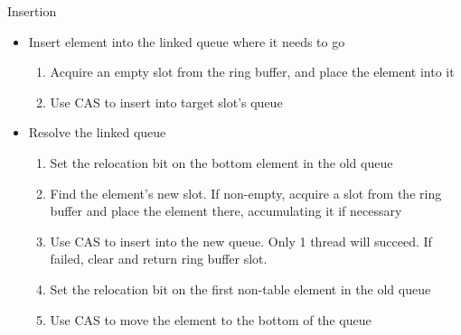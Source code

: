 \documentclass{article}
\begin{document}
Insertion
\begin{itemize}
\item Insert element into the linked queue where it needs to go
\begin{enumerate}
\item Acquire an empty slot from the ring buffer, and place the element into it
\item Use CAS to insert into target slot's queue
\end{enumerate}
\item Resolve the linked queue
\begin{enumerate}
\item Set the relocation bit on the bottom element in the old queue
\item Find the element's new slot. If non-empty, acquire a slot from the ring buffer and place the element there, accumulating it if necessary
\item Use CAS to insert into the new queue. Only 1 thread will succeed. If failed, clear and return ring buffer slot.
\item Set the relocation bit on the first non-table element in the old queue
\item Use CAS to move the element to the bottom of the queue
\end{enumerate}
\end{itemize}
\end{document}
